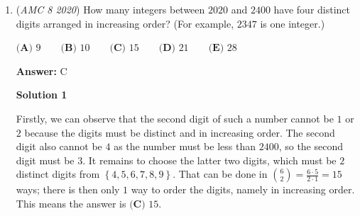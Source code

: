 \begin{enumerate}
 $\textbf{(A) }\text{Aaron} \qquad \textbf{(B) }\text{Darren} \qquad \textbf{(C) }\text{Karen} \qquad \textbf{(D) }\text{Maren}\qquad \textbf{(E) }\text{Sharon}$

 \textbf{Answer: }A



\textbf{Solution 1}

Write the order of the cars as $\square\square\square\square\square$, where the left end of the row represents the back of the train and the right end represents the front. Call the people $A$, $D$, $K$, $M$, and $S$ respectively. The first condition gives $M\square\square\square\square$, so we try $MAS\square\square$, $M\square AS\square$, and $M\square\square AS$. In the first case, as $D$ sat in front of $A$, we must have $MASDK$ or $MASKD$, which do not comply with the last condition. In the second case, we obtain $MKASD$, which works, while the third case is obviously impossible since it results in there being no way for $D$ to sit in front of $A$. It follows that, with the only possible arrangement being $MKASD$, the person sitting in the middle car is $\boxed{\textbf{(A) }\text{Aaron}}$.

 



\textbf{Solution 2}

Follow the first few steps of Solution 1. We must have $M\square\square\square\square$, and also have $AS\text{(anything)}D \text{ and } K\dots D$. There are only $4$ spaces available for $A, S, D, K$, so the only possible arrangement of them is $KASD$, so the arrangement is $MKASD$, so the person in the middle car is $\boxed{\textbf{(A) }\text{Aaron}}$.

 


	\item (\textit{AMC 8 2020}) How many integers between $2020$ and $2400$ have four distinct digits arranged in increasing order? (For example, $2347$ is one integer.)


 $\textbf{(A) }\text{9} \qquad \textbf{(B) }\text{10} \qquad \textbf{(C) }\text{15} \qquad \textbf{(D) }\text{21}\qquad \textbf{(E) }\text{28}$

 \textbf{Answer: }C



\textbf{Solution 1}

Firstly, we can observe that the second digit of such a number cannot be $1$ or $2$ because the digits must be distinct and in increasing order. The second digit also cannot be $4$ as the number must be less than $2400$, so the second digit must be $3$. It remains to choose the latter two digits, which must be $2$ distinct digits from $\left\{4,5,6,7,8,9\right\}$. That can be done in $\binom{6}{2} = \frac{6 \cdot 5}{2 \cdot 1} = 15$ ways; there is then only $1$ way to order the digits, namely in increasing order. This means the answer is $\boxed{\textbf{(C) }15}$.


\end{enumerate}
